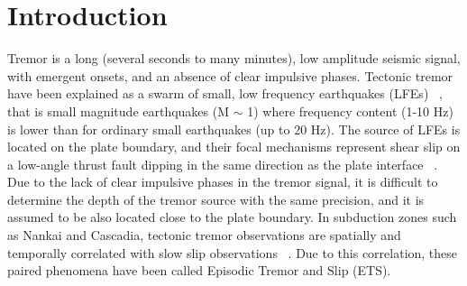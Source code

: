 \documentclass[draft]{agujournal2019}
\begin{document}

%
%
%
%


\section{Introduction}

Tremor is a long (several seconds to many minutes), low amplitude seismic signal, with emergent onsets, and an absence of clear impulsive phases. Tectonic tremor have been explained as a swarm of small, low frequency earthquakes (LFEs) ~\cite{SHE_2007_nature}, that is small magnitude earthquakes (M $\sim$ 1) where frequency content (1-10 Hz) is lower than for ordinary small earthquakes (up to 20 Hz). The source of LFEs is located on the plate boundary, and their focal mechanisms represent shear slip on a low-angle thrust fault dipping in the same direction as the plate interface ~\cite{IDE_2007_GRL, ROY_2014}. Due to the lack of clear impulsive phases in the tremor signal, it is difficult to determine the depth of the tremor source with the same precision, and it is assumed to be also located close to the plate boundary. In subduction zones such as Nankai and Cascadia, tectonic tremor observations are spatially and temporally correlated with slow slip observations ~\cite{OBA_2002, ROG_2003}. Due to this correlation, these paired phenomena have been called Episodic Tremor and Slip (ETS). \\
\end{document}
